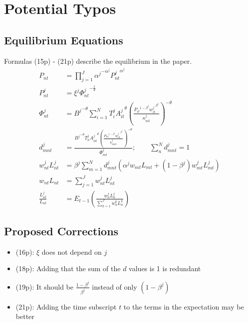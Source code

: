\documentclass[11pt,oneside,a4paper]{article}
\begin{document}
\newpage
\section{Potential Typos}

\subsection{Equilibrium Equations}
Formulas (15p) - (21p) describe the equilibrium in the paper.
\begin{align}
  P_{nt} &= \prod_{j = 1}^J {\alpha^j}^{- \alpha^j} {P_{nt}^j}^{\alpha^j} \tag{15p}\\
  P_{nt}^j &= \xi^j {\Phi_{nt}^j}^{-\frac{1}{\theta}} \tag{16p}\\
  \Phi_{nt}^j &= {B^j}^{-\theta} \sum_{i = 1}^N T_i^j {A_{it}^j}^{\theta} \left(\frac{{P_{it}}^{1 - \beta^j} {w_{it}^j}^{\beta^j}}{\kappa_{nit}^j}\right)^{-\theta} \tag{17p}\\
  d_{mnt}^j &= \frac{{B^j}^{-\theta} T_n^j {A_{nt}^j}^{\theta} \left(\frac{{P_{nt}}^{1 - \beta^j} {w_{nt}^j}^{\beta^j}}{\kappa_{mnt}^j}\right)^{-\theta}} {\Phi_{mt}^j}; \qquad \sum_n^N d^j_{mnt} = 1 \tag{18p}\\
  w_{nt}^j L_{nt}^j &= \beta^j \sum_{m = 1}^N d_{mnt}^j \left( \alpha^j w_{mt} L_{mt} + (1 - \beta^j) w_{mt}^j L_{mt}^j\right) \tag{19p}\\
  w_{nt} L_{nt} &= \sum_{j = 1}^J w_{nt}^j L_{nt}^j \tag{20p}\\
  \frac{L_{nt}^{j}}{L_{nt}} &= E_{t - 1} \left( \frac{w_{n}^{j} L_{n}^{j}}{\sum_{k = 1}^J w_{n}^k L_{n}^k}\right)  \tag{21p}
\end{align}

\subsection{Proposed Corrections} 
\begin{itemize}
  \item (16p): $\xi$ does not depend on $j$
  \item (18p): Adding that the sum of the $d$ values is 1 is redundant
  \item (19p): It should be $\frac{1 - \beta^j}{\beta^j}$ instead of only $(1 - \beta^j)$
  \item (21p): Adding the time subscript $t$ to the terms in the expectation may be better
\end{itemize}
\end{document}
